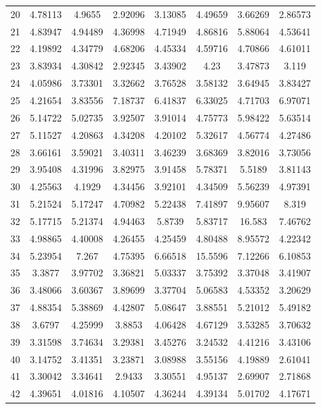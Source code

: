 \begin{center}
\begin{longtable}{cccccccc}
20 & 4.78113 & 4.9655 & 2.92096 & 3.13085 & 4.49659 & 3.66269 & 2.86573\\
21 & 4.83947 & 4.94489 & 4.36998 & 4.71949 & 4.86816 & 5.88064 & 4.53641\\
22 & 4.19892 & 4.34779 & 4.68206 & 4.45334 & 4.59716 & 4.70866 & 4.61011\\
23 & 3.83934 & 4.30842 & 2.92345 & 3.43902 & 4.23 & 3.47873 & 3.119\\
24 & 4.05986 & 3.73301 & 3.32662 & 3.76528 & 3.58132 & 3.64945 & 3.83427\\
25 & 4.21654 & 3.83556 & 7.18737 & 6.41837 & 6.33025 & 4.71703 & 6.97071\\
26 & 5.14722 & 5.02735 & 3.92507 & 3.91014 & 4.75773 & 5.98422 & 5.63514\\
27 & 5.11527 & 4.20863 & 4.34208 & 4.20102 & 5.32617 & 4.56774 & 4.27486\\
28 & 3.66161 & 3.59021 & 3.40311 & 3.46239 & 3.68369 & 3.82016 & 3.73056\\
29 & 3.95408 & 4.31996 & 3.82975 & 3.91458 & 5.78371 & 5.5189 & 3.81143\\
30 & 4.25563 & 4.1929 & 4.34456 & 3.92101 & 4.34509 & 5.56239 & 4.97391\\
31 & 5.21524 & 5.17247 & 4.70982 & 5.22438 & 7.41897 & 9.95607 & 8.319\\
32 & 5.17715 & 5.21374 & 4.94463 & 5.8739 & 5.83717 & 16.583 & 7.46762\\
33 & 4.98865 & 4.40008 & 4.26455 & 4.25459 & 4.80488 & 8.95572 & 4.22342\\
34 & 5.23954 & 7.267 & 4.75395 & 6.66518 & 15.5596 & 7.12266 & 6.10853\\
35 & 3.3877 & 3.97702 & 3.36821 & 5.03337 & 3.75392 & 3.37048 & 3.41907\\
36 & 3.48066 & 3.60367 & 3.89699 & 3.37704 & 5.06583 & 4.53352 & 3.20629\\
37 & 4.88354 & 5.38869 & 4.42807 & 5.08647 & 3.88551 & 5.21012 & 5.49182\\
38 & 3.6797 & 4.25999 & 3.8853 & 4.06428 & 4.67129 & 3.53285 & 3.70632\\
39 & 3.31598 & 3.74634 & 3.29381 & 3.45276 & 3.24532 & 4.41216 & 3.43106\\
40 & 3.14752 & 3.41351 & 3.23871 & 3.08988 & 3.55156 & 4.19889 & 2.61041\\
41 & 3.30042 & 3.34641 & 2.9433 & 3.30551 & 4.95137 & 2.69907 & 2.71868\\
42 & 4.39651 & 4.01816 & 4.10507 & 4.36244 & 4.39134 & 5.01702 & 4.17671\\

\end{longtable}
\end{center}

